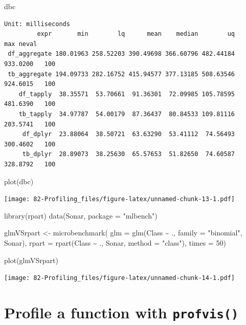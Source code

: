\documentclass[
]{book}
\newenvironment{Shaded}{\begin{snugshade}}{\end{snugshade}}
\newcommand{\AttributeTok}[1]{\textcolor[rgb]{0.77,0.63,0.00}{#1}}
\newcommand{\DecValTok}[1]{\textcolor[rgb]{0.00,0.00,0.81}{#1}}
\newcommand{\FunctionTok}[1]{\textcolor[rgb]{0.00,0.00,0.00}{#1}}
\newcommand{\NormalTok}[1]{#1}
\newcommand{\OtherTok}[1]{\textcolor[rgb]{0.56,0.35,0.01}{#1}}
\newcommand{\SpecialCharTok}[1]{\textcolor[rgb]{0.00,0.00,0.00}{#1}}
\newcommand{\StringTok}[1]{\textcolor[rgb]{0.31,0.60,0.02}{#1}}
\begin{document}
\begin{Shaded}
\begin{Highlighting}[]
\NormalTok{dbc}
\end{Highlighting}
\end{Shaded}

\begin{verbatim}
Unit: milliseconds
         expr       min        lq      mean    median        uq      max neval
 df_aggregate 180.01963 258.52203 390.49698 366.60796 482.44184 933.0200   100
 tb_aggregate 194.09733 282.16752 415.94577 377.13185 508.63546 924.6015   100
    df_tapply  38.35571  53.70661  91.36301  72.09985 105.78595 481.6390   100
    tb_tapply  34.97787  54.00179  87.36437  80.84533 109.81116 203.5741   100
     df_dplyr  23.88064  38.50721  63.63290  53.41112  74.56493 300.4602   100
     tb_dplyr  28.89073  38.25630  65.57653  51.82650  74.60587 328.8792   100
\end{verbatim}

\begin{Shaded}
\begin{Highlighting}[]
\FunctionTok{plot}\NormalTok{(dbc)}
\end{Highlighting}
\end{Shaded}

\texttt{[image: 82-Profiling\_files/figure-latex/unnamed-chunk-13-1.pdf]}

\begin{Shaded}
\begin{Highlighting}[]
\FunctionTok{library}\NormalTok{(rpart)}
\FunctionTok{data}\NormalTok{(Sonar, }\AttributeTok{package =} \StringTok{"mlbench"}\NormalTok{)}

\NormalTok{glmVSrpart }\OtherTok{\textless{}{-}} \FunctionTok{microbenchmark}\NormalTok{(}
  \AttributeTok{glm =} \FunctionTok{glm}\NormalTok{(Class }\SpecialCharTok{\textasciitilde{}}\NormalTok{ ., }\AttributeTok{family =} \StringTok{"binomial"}\NormalTok{, Sonar),}
  \AttributeTok{rpart =} \FunctionTok{rpart}\NormalTok{(Class }\SpecialCharTok{\textasciitilde{}}\NormalTok{ ., Sonar, }\AttributeTok{method =} \StringTok{"class"}\NormalTok{),}
  \AttributeTok{times =} \DecValTok{50}\NormalTok{)}

\FunctionTok{plot}\NormalTok{(glmVSrpart)}
\end{Highlighting}
\end{Shaded}

\texttt{[image: 82-Profiling\_files/figure-latex/unnamed-chunk-14-1.pdf]}

\hypertarget{profile-a-function-with-profvis}{%
\section{\texorpdfstring{Profile a function with \texttt{profvis()}}{Profile a function with profvis()}}\label{profile-a-function-with-profvis}}
\end{document}
